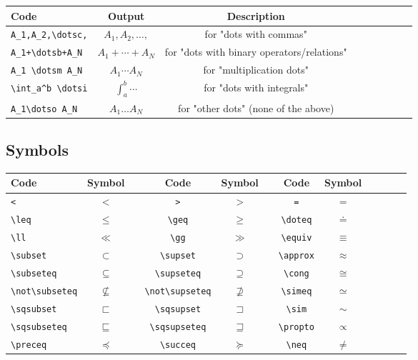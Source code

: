 \documentclass{article}
\begin{document}
\vspace{5mm}

\begin{tabular}{l*{7}{c}r}
	Code & Output & Description \\
	\hline
	\verb|A_1,A_2,\dotsc,| & $A_1,A_2,\dotsc,$ & 	for "dots with commas" \\
	\verb|A_1+\dotsb+A_N| & $A_1+\dotsb+A_N$ & for "dots with binary operators/relations" \\
	\verb|A_1 \dotsm A_N| & $A_1 \dotsm A_N$ & for "multiplication dots" \\
	\verb|\int_a^b \dotsi| & $\displaystyle{\int_a^b \dotsi}$ & 	for "dots with integrals" \\
	\verb|A_1\dotso A_N| & $A_1\dotso A_N$ & for "other dots" (none of the above)
\end{tabular}

\subsection{Symbols}

\begin{tabular}{l*{10}{c}r}
	Code & Symbol & \vline & Code & Symbol & \vline & Code & Symbol \\
	\hline
	\verb|<| & $<$ & \vline & \verb|>| & $>$ & \vline & \verb|=| & $=$ \\
	\verb|\leq| & $\leq$ & \vline & \verb|\geq| & $\geq$ & \vline & \verb|\doteq| & $\doteq$ \\
	\verb|\ll| & $\ll$ & \vline & \verb|\gg| & $\gg$ & \vline & \verb|\equiv| & $\equiv$ \\
	\verb|\subset| & $\subset$ & \vline & \verb|\supset| & $\supset$ & \vline & \verb|\approx| & $\approx$ \\
	\verb|\subseteq| & $\subseteq$ & \vline & \verb|\supseteq| & $\supseteq$ & \vline & \verb|\cong| & $\cong$ \\
	\verb|\not\subseteq| & $\not\subseteq$ & \vline & \verb|\not\supseteq| & $\not\supseteq$ & \vline & \verb|\simeq| & $\simeq$ \\
	\verb|\sqsubset| & $\sqsubset$ & \vline & \verb|\sqsupset| & $\sqsupset$ & \vline & \verb|\sim| & $\sim$ \\
	\verb|\sqsubseteq| & $\sqsubseteq$ & \vline & \verb|\sqsupseteq| & $\sqsupseteq$ & \vline & \verb|\propto| & $\propto$ \\
	\verb|\preceq| & $\preceq$ & \vline & \verb|\succeq| & $\succeq$ & \vline & \verb|\neq| & $\neq$
\end{tabular}
\end{document}

